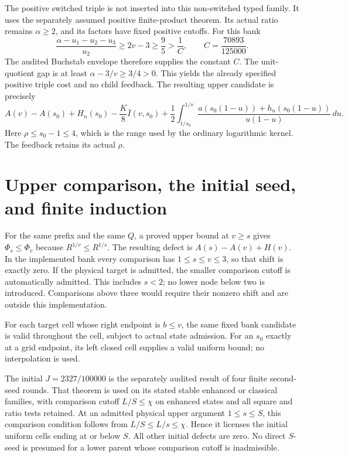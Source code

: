 \documentclass[11pt]{article}
\begin{document}
The positive switched triple is not inserted into this non-switched
typed family. It uses the separately assumed positive finite-product
theorem. Its actual ratio remains $\alpha\ge2$, and its factors have
fixed positive cutoffs. For this bank
\[
 \frac{\alpha-u_1-u_2-u_3}{u_2}\ge2v-3\ge\frac95>\frac1C,
 \qquad C=\frac{70893}{125000}.
\]
The audited Buchstab envelope therefore supplies the constant $C$.
The unit-quotient gap is at least $\alpha-3/v\ge3/4>0$.
This yields the already specified positive triple cost and no child
feedback. The resulting upper candidate is precisely
\[
 A(v)-A(s_0)+H_n(s_0)-\frac K8\overline I(v,s_0)
 +\frac12\int_{1/s_0}^{1/v}
      \frac{a(s_0(1-u))+h_n(s_0(1-u))}{u(1-u)}\,du.
\]
Here $\rho\le s_0-1\le4$, which is the range used by the ordinary
logarithmic kernel. The feedback retains its actual $\rho$.

\section{Upper comparison, the initial seed, and finite induction}
For the same prefix and the same $Q$, a proved upper bound at $v\ge s$
gives $\Phi_s\le\Phi_v$ because $R^{1/v}\le R^{1/s}$. The resulting
defect is $A(s)-A(v)+H(v)$. In the implemented bank every comparison
has $1\le s\le v\le3$, so that shift is exactly zero. If the physical
target is admitted, the smaller comparison cutoff is automatically
admitted. This includes $s<2$; no lower node below two is introduced.
Comparisons above three would require their nonzero shift and are
outside this implementation.

For each target cell whose right endpoint is $b\le v$, the same
fixed bank candidate is valid throughout the cell, subject to actual
state admission. For an $s_0$ exactly at a grid endpoint, its left
closed cell supplies a valid uniform bound; no interpolation is used.

The initial $J=2327/100000$ is the separately audited result of four
finite second-seed rounds. That theorem is used on its stated stable
enhanced or classical families, with comparison cutoff $L/S\le\chi$
on enhanced states and all square and ratio tests retained. At an
admitted physical upper argument $1\le s\le S$, this comparison
condition follows from $L/S\le L/s\le\chi$. Hence it licenses the
initial uniform cells ending at or below $S$. All other initial
defects are zero. No direct $S$-seed is presumed for a lower parent
whose comparison cutoff is inadmissible.
\end{document}
